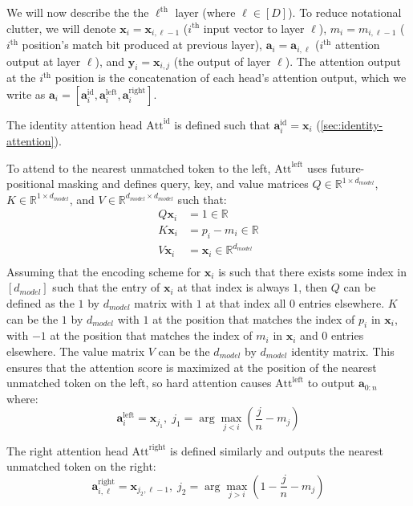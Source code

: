 We will now describe the the $\ell^\text{th}$ layer (where $\ell \in [D]$). 
To reduce notational clutter, we will denote $\mathbf{x}_{i}=\mathbf{x}_{i,\ell-1}$ ($i^\text{th}$ input vector to layer $\ell$), $m_i = m_{i,\ell-1}$ ($i^\text{th}$ position's match bit produced at previous layer), $\mathbf{a}_i=\mathbf{a}_{i,\ell}$ ($i^\text{th}$ attention output at layer $\ell$), and $\mathbf{y}_{i} = \mathbf{x}_{i,j}$ (the output of layer $\ell$). The attention output at the $i^{\text{th}}$ position is the concatenation of each head's attention output, which we write as $\mathbf{a}_{i} = [\mathbf{a}_{i}^{\mathrm{id}}, \mathbf{a}_{i}^{\mathrm{left}}, \mathbf{a}_{i}^{\mathrm{right}}]$.

The identity attention head $\mathrm{Att}^{\mathrm{id}}$ is defined such that $\mathbf{a}_{i}^{\mathrm{id}} = \mathbf{x}_i$ (\cref{sec:identity-attention}).

To attend to the nearest unmatched token to the left, $\mathrm{Att}^{\mathrm{left}}$ uses future-positional masking and defines query, key, and value matrices $Q \in \mathbb{R}^{1 \times d_{model}}$, $K \in \mathbb{R}^{1 \times d_{model}}$, and $V \in \mathbb{R}^{d_{model} \times d_{model}}$ such that:\begin{align*}
    Q\mathbf{x}_{i} & = 1 \in \mathbb{R}\\
    K\mathbf{x}_{i} & = p_i - m_i \in \mathbb{R}\\
    V\mathbf{x}_i & = \mathbf{x}_i \in \mathbb{R}^{d_{model}}\\
\end{align*}
Assuming that the encoding scheme for $\mathbf{x}_i$ is such that there exists some index in $[d_{model}]$ such that the entry of $\mathbf{x}_{i}$ at that index is always $1$, then $Q$ can be defined as the $1$ by $d_{model}$ matrix with $1$ at that index all $0$ entries elsewhere.
$K$ can be the $1$ by $d_{model}$ with $1$ at the position that matches the index of $p_i$ in $\mathbf{x}_i$, with $-1$ at the position that matches the index of $m_i$ in $\mathbf{x}_i$ and $0$ entries elsewhere.
The value matrix $V$ can be the $d_{model}$ by $d_{model}$ identity matrix. This ensures that the attention score is maximized at the position of the nearest unmatched token on the left, so hard attention causes $\mathrm{Att}^{\mathrm{left}}$ to output $\mathbf{a}_{0:n}$ where:
$$\mathbf{a}_{i}^{\mathrm{left}} = \mathbf{x}_{j_1}, \; j_1 = \arg \max_{j<i}\left(\frac{j}{n} - m_{j}\right)$$

The right attention head $\mathrm{Att}^{\mathrm{right}}$ is defined similarly and outputs the nearest unmatched token on the right:
$$\mathbf{a}_{i,\ell}^{\mathrm{right}} =  \mathbf{x}_{j_2,\ell-1}, \; j_2 = \arg \max_{j>i}\left(1 - \frac{j}{n} - m_{j}\right)$$


